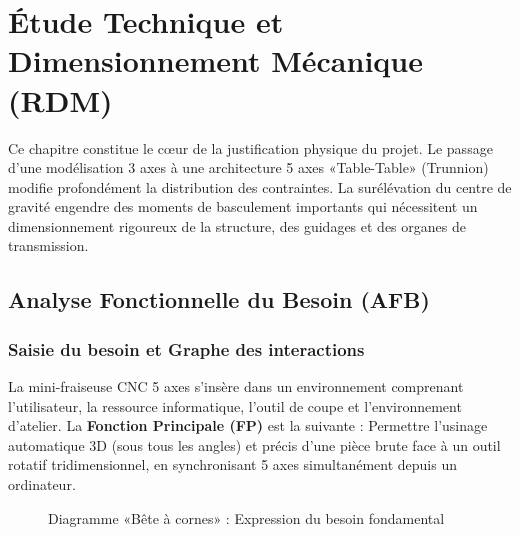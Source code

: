 \chapter{Étude Technique et Dimensionnement Mécanique (RDM)}
\label{chap:conception_mec}

Ce chapitre constitue le cœur de la justification physique du projet. Le passage d'une modélisation 3 axes à une architecture 5 axes «Table-Table» (Trunnion) modifie profondément la distribution des contraintes. La surélévation du centre de gravité engendre des moments de basculement importants qui nécessitent un dimensionnement rigoureux de la structure, des guidages et des organes de transmission.

\section{Analyse Fonctionnelle du Besoin (AFB)}

\subsection{Saisie du besoin et Graphe des interactions}
La mini-fraiseuse CNC 5 axes s'insère dans un environnement comprenant l'utilisateur, la ressource informatique, l'outil de coupe et l'environnement d'atelier.
La \textbf{Fonction Principale (FP)} est la suivante : Permettre l'usinage automatique 3D (sous tous les angles) et précis d'une pièce brute face à un outil rotatif tridimensionnel, en synchronisant 5 axes simultanément depuis un ordinateur.

\begin{figure}[htbp]
    \centering
    \caption{Diagramme «Bête à cornes» : Expression du besoin fondamental}
    \label{fig:bete_a_cornes}
\end{figure}

